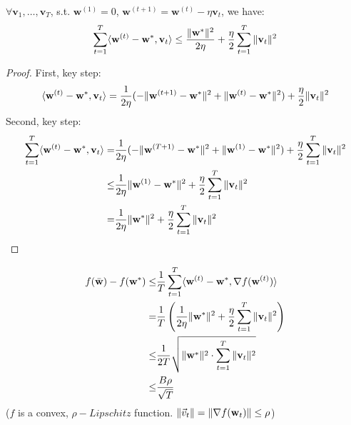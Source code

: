 \begin{lem}
	$ \forall \mathbf{v}_1, \dots, \mathbf{v}_T $, s.t. $ \mathbf{w}^{(1)} = 0 $, 
	$ \mathbf{w}^{(t+1)} = \mathbf{w}^{(t)}-\eta \mathbf{v}_t $, we have:
	\begin{equation}
		\sum\limits^T_{t=1} \langle \mathbf{w}^{(t)} - \mathbf{w}^*, \mathbf{v}_t \rangle
		\le \frac{\Arrowvert \mathbf{w}^* \Arrowvert^2}{2\eta} + \frac{\eta}{2}
		\sum\limits^T_{t=1} \Arrowvert \mathbf{v}_t \Arrowvert^2
	\end{equation}
	\begin{proof}
		First, key step:
		\[ 
			\langle \mathbf{w}^{(t)} - \mathbf{w}^*, \mathbf{v}_t \rangle
			= \frac{1}{2\eta}(-\Arrowvert \mathbf{w}^{(t+1)} - \mathbf{w}^* \Arrowvert^2 + 
			\Arrowvert \mathbf{w}^{(t)} - \mathbf{w}^* \Arrowvert^2) + \frac{\eta}{2}
			\Arrowvert \mathbf{v}_t \Arrowvert^2
		\]
		Second, key step:
		\begin{align*}
			\sum\limits^T_{t=1} \langle \mathbf{w}^{(t)} - \mathbf{w}^*, \mathbf{v}_t \rangle
			=& \frac{1}{2\eta}(-\Arrowvert \mathbf{w}^{(T+1)} - \mathbf{w}^* \Arrowvert^2 + 
			\Arrowvert \mathbf{w}^{(1)} - \mathbf{w}^* \Arrowvert^2) + \frac{\eta}{2}
			\sum\limits^T_{t=1} \Arrowvert \mathbf{v}_t \Arrowvert^2 \\
			\le& \frac{1}{2\eta} \Arrowvert \mathbf{w}^{(1)} - \mathbf{w}^* \Arrowvert^2 
			+\frac{\eta}{2}\sum\limits^T_{t=1} \Arrowvert \mathbf{v}_t \Arrowvert^2 \\
			=& \frac{1}{2\eta} \Arrowvert \mathbf{w}^* \Arrowvert^2 
			+\frac{\eta}{2}\sum\limits^T_{t=1} \Arrowvert \mathbf{v}_t \Arrowvert^2 \\
		\end{align*}
	\end{proof}
\end{lem}

\begin{align*}
	f(\bar{\mathbf{w}}) - f(\mathbf{w}^*)
	\le& \frac{1}{T} \sum\limits^T_{t=1} \langle \mathbf{w}^{(t)} - \mathbf{w}^*, \nabla f(\mathbf{w}^{(t)}) \rangle\\
	=& \frac{1}{T} \left( \frac{1}{2\eta} \Arrowvert \mathbf{w}^* \Arrowvert^2 
	+\frac{\eta}{2}\sum\limits^T_{t=1} \Arrowvert \mathbf{v}_t \Arrowvert^2 \right)\\
	\le& \frac{1}{2T} 
	\sqrt{\Arrowvert \mathbf{w}^* \Arrowvert^2 \cdot \sum\limits^T_{t=1} \Arrowvert \mathbf{v}_t \Arrowvert^2}\\
	\le& \frac{B \rho}{\sqrt T}
\end{align*}
($ f $ is a convex, $ \rho-Lipschitz $ function. 
$ \Arrowvert \vec{v}_t \Arrowvert = \Arrowvert \nabla f( \textbf{w}_t) \Arrowvert \le \rho $)

